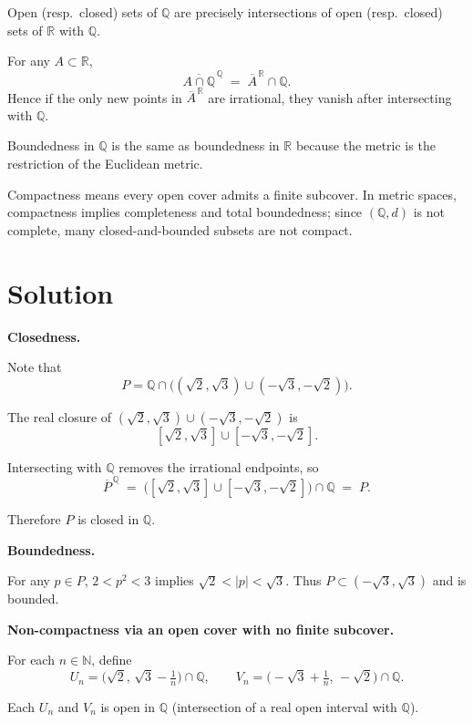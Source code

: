 \documentclass[12pt,a4paper]{article}
\theoremstyle{plain}
\theoremstyle{definition}
\theoremstyle{remark}
\theoremstyle{remark}
\begin{document}
Open (resp.\ closed) sets of \(\mathbb{Q}\) are precisely intersections of open (resp.\ closed) sets of \(\mathbb{R}\) with \(\mathbb{Q}\).

For any \(A\subset\mathbb{R}\),
\[
\overline{A\cap\mathbb{Q}}^{\,\mathbb{Q}} \;=\; \overline{A}^{\,\mathbb{R}} \cap \mathbb{Q}.
\]
Hence if the only new points in \(\overline{A}^{\,\mathbb{R}}\) are irrational, they vanish after intersecting with \(\mathbb{Q}\).

Boundedness in \(\mathbb{Q}\) is the same as boundedness in \(\mathbb{R}\) because the metric is the restriction of the Euclidean metric.

Compactness means every open cover admits a finite subcover. In metric spaces, compactness implies completeness and total boundedness; since \((\mathbb{Q},d)\) is not complete, many closed-and-bounded subsets are not compact.

\bigskip

\section*{Solution}

\noindent\textbf{Closedness.}

Note that
\[
P = \mathbb{Q} \cap \big( (\sqrt{2},\sqrt{3}) \cup (-\sqrt{3},-\sqrt{2}) \big).
\]

The real closure of \((\sqrt{2},\sqrt{3}) \cup (-\sqrt{3},-\sqrt{2})\) is
\[
[\sqrt{2},\sqrt{3}] \cup [-\sqrt{3},-\sqrt{2}].
\]

Intersecting with \(\mathbb{Q}\) removes the irrational endpoints, so
\[
\overline{P}^{\,\mathbb{Q}} \;=\; \big( [\sqrt{2},\sqrt{3}] \cup [-\sqrt{3},-\sqrt{2}] \big) \cap \mathbb{Q} \;=\; P.
\]

Therefore \(P\) is closed in \(\mathbb{Q}\).

\bigskip

\noindent\textbf{Boundedness.}

For any \(p\in P\), \(2 < p^2 < 3\) implies \(\sqrt{2} < |p| < \sqrt{3}\).
Thus \(P\subset (-\sqrt{3},\sqrt{3})\) and is bounded.

\bigskip

\noindent\textbf{Non-compactness via an open cover with no finite subcover.}

For each \(n\in\mathbb{N}\), define
\[
U_n = \big(\sqrt{2},\, \sqrt{3}-\tfrac{1}{n} \big) \cap \mathbb{Q},
\qquad
V_n = \big( -\sqrt{3}+\tfrac{1}{n},\, -\sqrt{2} \big) \cap \mathbb{Q}.
\]

Each \(U_n\) and \(V_n\) is open in \(\mathbb{Q}\) (intersection of a real open interval with \(\mathbb{Q}\)).
\end{document}
